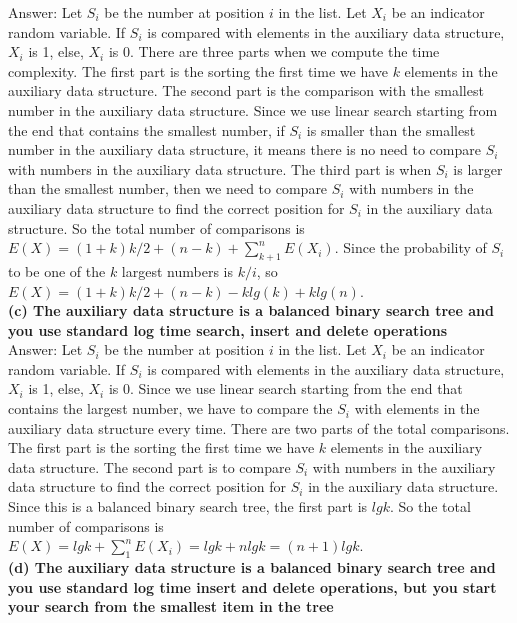 \documentclass{article}
\begin{document}
Answer: Let $S_i$ be the number at position $i$ in the list. Let $X_i$ be an indicator random variable. If $S_i$ is compared with elements in the auxiliary data structure, $X_i$ is 1, else, $X_i$ is 0. There are three parts when we compute the time complexity. The first part is the sorting the first time we have $k$ elements in the auxiliary data structure. The second part is the comparison with the smallest number in the auxiliary data structure. Since we use linear search starting from the end that contains the smallest number, if $S_i$ is smaller than the smallest number in the auxiliary data structure, it means there is no need to compare $S_i$ with numbers in the auxiliary data structure. The third part is when $S_i$ is larger than the smallest number, then we need to compare $S_i$ with numbers in the auxiliary data structure to find the correct position for $S_i$ in the auxiliary data structure. So the total number of comparisons is $E(X) = (1+k)k/2 + (n - k) + \sum_{k+1}^{n}E(X_i)$. Since the probability of $S_i$ to be one of the $k$ largest numbers is $k/i$, so $E(X) = (1+k)k/2 + (n - k) - klg(k) + klg(n)$.\\ \newline
\textbf{(c) The auxiliary data structure is a balanced binary search tree and you use standard log time search, insert and delete operations} \\ \newline
Answer: Let $S_i$ be the number at position $i$ in the list. Let $X_i$ be an indicator random variable. If $S_i$ is compared with elements in the auxiliary data structure, $X_i$ is 1, else, $X_i$ is 0. Since we use linear search starting from the end that contains the largest number, we have to compare the $S_i$ with elements in the auxiliary data structure every time. There are two parts of the total comparisons. The first part is the sorting the first time we have $k$ elements in the auxiliary data structure. The second part is to compare $S_i$ with numbers in the auxiliary data structure to find the correct position for $S_i$ in the auxiliary data structure. Since this is a balanced binary search tree, the first part is $lgk$. So the total number of comparisons is $E(X) = lgk + \sum_{1}^{n}E(X_i) = lgk + nlgk = (n+1)lgk$. \\ \newline
\textbf{(d) The auxiliary data structure is a balanced binary search tree and you use standard log time insert and delete operations, but you start your search from the smallest item in the tree} \\ \newline
\end{document}
